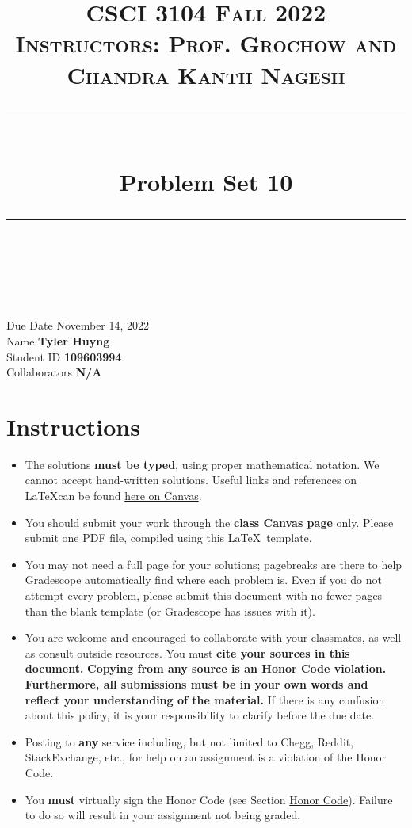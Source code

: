 \documentclass[11pt]{article}
\title{
\normalfont \normalsize 
\textsc{CSCI 3104 Fall 2022 \\ 
Instructors: Prof. Grochow and Chandra Kanth Nagesh} \\
[10pt] 
\rule{\linewidth}{0.5pt} \\[6pt] 
\huge Problem Set 10 \\
\rule{\linewidth}{2pt}  \\[10pt]
}
\date{}
\theoremstyle{definition}
\theoremstyle{definition}
\theoremstyle{definition}
\begin{document}

\maketitle


\noindent
Due Date \dotfill November 14, 2022 \\
Name \dotfill \textbf{Tyler Huyng} \\
Student ID \dotfill \textbf{109603994} \\
Collaborators \dotfill \textbf{N/A}

\tableofcontents

\section*{Instructions}
 \begin{itemize}
	\item The solutions \textbf{must be typed}, using proper mathematical notation. We cannot accept hand-written solutions. Useful links and references on \LaTeX can be found \href{https://canvas.colorado.edu/courses/75824/pages/latex}{here on Canvas}.
	\item You should submit your work through the \textbf{class Canvas page} only. Please submit one PDF file, compiled using this \LaTeX \ template.
	\item You may not need a full page for your solutions; pagebreaks are there to help Gradescope automatically find where each problem is. Even if you do not attempt every problem, please submit this document with no fewer pages than the blank template (or Gradescope has issues with it).

	\item You are welcome and encouraged to collaborate with your classmates, as well as consult outside resources. You must \textbf{cite your sources in this document.} \textbf{Copying from any source is an Honor Code violation. Furthermore, all submissions must be in your own words and reflect your understanding of the material.} If there is any confusion about this policy, it is your responsibility to clarify before the due date. 

	\item Posting to \textbf{any} service including, but not limited to Chegg, Reddit, StackExchange, etc., for help on an assignment is a violation of the Honor Code.

	\item You \textbf{must} virtually sign the Honor Code (see Section \hyperlink{HonorCode}{Honor Code}). Failure to do so will result in your assignment not being graded.
\end{itemize}
\end{document}
